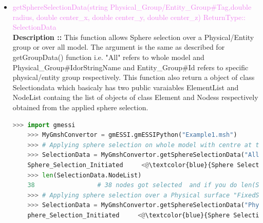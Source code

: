 \documentclass[11pt]{article}
\begin{document}
\begin{itemize}
    \item \textcolor{violet}{ getSphereSelectionData(string Physical\_Group/Entity\_Group\#Tag,double radius, double center_x, double center_y, double center_z) \hfill {ReturnType:: SelectionData}} \\
    \textbf{Description ::} This function allows Sphere selection over a Physical/Entity group or over all model. The argument is the same as described for getGroupData() function i.e. "All" refers to whole model and Physical\_Group\#IdorStringName and Entity\_Group\#Id refers to specific physical/entity group respectively. This function also return a object of class Selectiondata which basicaly has two public varaiables ElementList and NodeList containg the list of objects of class Element and Nodess respectively obtained from the applied sphere selection. 
    \begin{lstlisting}[language=Python]
    >>> import gmessi
    >>> MyGmshConvertor = gmESSI.gmESSIPython("Example1.msh")
    >>> # Applying sphere selection on whole model with centre at the cente of the model (2,0.5,0.5) and radius as 2 units
    >>> SelectionData = MyGmshConvertor.getSphereSelectionData("All",2,2,0.5,0.5)
    Sphere_Selection_Initiated     <@\textcolor{blue}{Sphere Selection Made over All Model with radius 2 and center at 2 0.5 0.5}@> 
    >>> len(SelectionData.NodeList)
    38                 # 38 nodes got selected  and if you do len(SelectionData.ElementList) it would show 20 elements got selected
    >>> # Applying sphere selection over a Physical surface "FixedSurface" having id 1 can be done by writing "Physical_Group#1" or "Physical_Group#FixedSurface"
    >>> SelectionData = MyGmshConvertor.getSphereSelectionData("Physical_Group#1",0.5,0,0.5,0.5)
    phere_Selection_Initiated     <@\textcolor{blue}{Sphere Selection Made over Physical_Group\#1 with radius 0.5 and center at 0 0.5 0.5}@> 
    \end{lstlisting}


\end{itemize}
\end{document}
